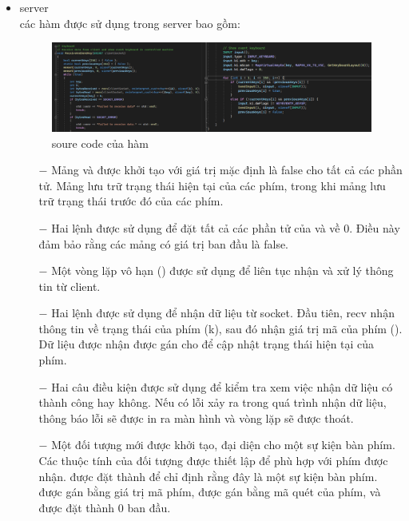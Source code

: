 \begin{itemize}
    \item  server \\
    các hàm được sử dụng trong server bao gồm:\\
    \begin{figure}[H]
    \begin{center}
    \includegraphics[scale=0.5]{img/ReceiveAndSendKey.png}
    \caption{soure code của hàm \textbf{}}
    \end{center}
    \end{figure}
    \begin{itemize}
        \item[$-$] Mảng \textbf{} và \textbf{} được khởi tạo với giá trị mặc định là false cho tất cả các phần tử. Mảng \textbf{} lưu trữ trạng thái hiện tại của các phím, trong khi mảng \textbf{} lưu trữ trạng thái trước đó của các phím.
        \item[$-$] Hai lệnh \textbf{} được sử dụng để đặt tất cả các phần tử của \textbf{} và \textbf{} về 0. Điều này đảm bảo rằng các mảng có giá trị ban đầu là false.
        \item[$-$] Một vòng lặp vô hạn (\textbf{}) được sử dụng để liên tục nhận và xử lý thông tin từ client.
        \item[$-$] Hai lệnh \textbf{} được sử dụng để nhận dữ liệu từ socket. Đầu tiên, recv nhận thông tin về trạng thái của phím (k), sau đó \textbf{} nhận giá trị mã của phím (\textbf{}). Dữ liệu được nhận được gán cho \textbf{} để cập nhật trạng thái hiện tại của phím.
        \item[$-$] Hai câu điều kiện \textbf{} được sử dụng để kiểm tra xem việc nhận dữ liệu có thành công hay không. Nếu có lỗi xảy ra trong quá trình nhận dữ liệu, thông báo lỗi sẽ được in ra màn hình và vòng lặp sẽ được thoát.
        \item[$-$] Một đối tượng \textbf{} mới được khởi tạo, đại diện cho một sự kiện bàn phím. Các thuộc tính của đối tượng \textbf{} được thiết lập để phù hợp với phím được nhận. \textbf{} được đặt thành \textbf{} để chỉ định rằng đây là một sự kiện bàn phím. \textbf{} được gán bằng giá trị mã phím, \textbf{} được gán bằng mã quét của phím, và \textbf{} được đặt thành 0 ban đầu.

\end{itemize}
\end{itemize}
